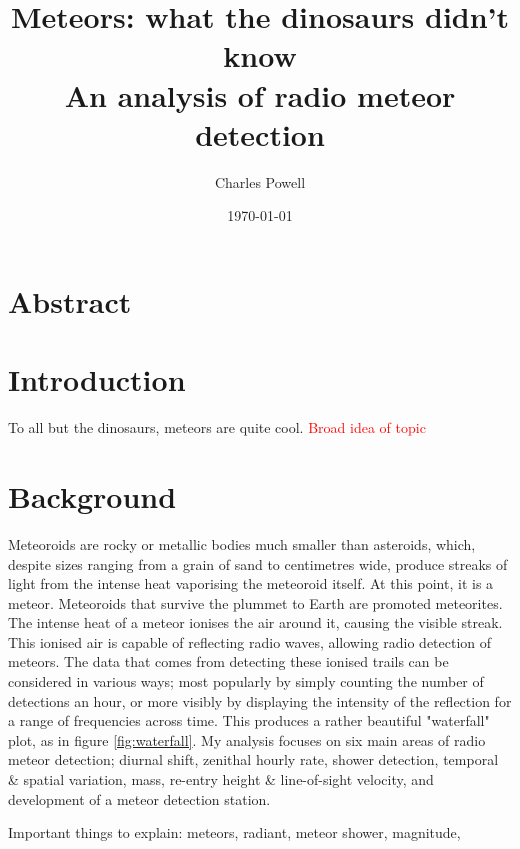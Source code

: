 \documentclass[a4paper,12pt,twocolumn]{report}
\begin{document}
	
\title{Meteors: what the dinosaurs didn't know \\ \large An analysis of radio meteor detection}
\author{Charles Powell}
\date{\today}
\maketitle


\section{Abstract}
\section{Introduction}
To all but the dinosaurs, meteors are quite cool.
\textcolor{red}{Broad idea of topic}
\section{Background}
Meteoroids are rocky or metallic bodies much smaller than asteroids, which, despite sizes ranging from a grain of sand to centimetres wide, produce streaks of light from the intense heat vaporising the meteoroid itself. At this point, it is a meteor. Meteoroids that survive the plummet to Earth are promoted meteorites. \\
The intense heat of a meteor ionises the air around it, causing the visible streak. This ionised air is capable of reflecting radio waves, allowing radio detection of meteors. The data that comes from detecting these ionised trails can be considered in various ways; most popularly by simply counting the number of detections an hour, or more visibly by displaying the intensity of the reflection for a range of frequencies across time. This produces a rather beautiful "waterfall" plot, as in figure \ref{fig:waterfall}.
My analysis focuses on six main areas of radio meteor detection; diurnal shift, zenithal hourly rate, shower detection, temporal \& spatial variation, mass, re-entry height \& line-of-sight velocity, and development of a meteor detection station. 

Important things to explain: meteors, radiant, meteor shower, magnitude, 






\end{document}
